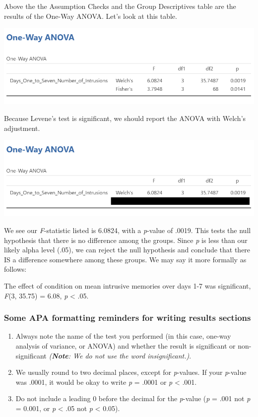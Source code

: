\documentclass[
]{book}
\begin{document}
Above the the Assumption Checks and the Group Descriptives table are the results of the One-Way ANOVA. Let's look at this table.

\includegraphics{img/OneWayANOVAResultsANOVATable.png}

Because Levene's test is significant, we should report the ANOVA with Welch's adjustment.

\includegraphics{img/OneWayANOVAResultsANOVATableReadingWelchs.png}

We see our \emph{F}-statistic listed is 6.0824, with a \emph{p}-value of .0019. This tests the null hypothesis that there is no difference among the groups. Since \emph{p} is less than our likely alpha level (.05), we can reject the null hypothesis and conclude that there IS a difference somewhere among these groups. We may say it more formally as follows:

The effect of condition on mean intrusive memories over days 1-7 was significant, \emph{F}(3, 35.75) = 6.08, \emph{p} \textless{} .05.

\hypertarget{some-apa-formatting-reminders-for-writing-results-sections-1}{%
\subsubsection{Some APA formatting reminders for writing results sections}\label{some-apa-formatting-reminders-for-writing-results-sections-1}}

\begin{enumerate}
\def\labelenumi{\arabic{enumi}.}
\item
  Always note the name of the test you performed (in this case, one-way analysis of variance, or ANOVA) and whether the result is significant or non-significant \emph{(\textbf{Note}: We do not use the word insignificant.)}.
\item
  We usually round to two decimal places, except for \emph{p}-values. If your \emph{p}-value was .0001, it would be okay to write \emph{p} = .0001 or \emph{p} \textless{} .001.
\item
  Do not include a leading 0 before the decimal for the \emph{p}-value (\emph{p} = .001 not \emph{p} = 0.001, or \emph{p} \textless{} .05 not \emph{p} \textless{} 0.05).
\end{enumerate}
\end{document}

